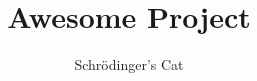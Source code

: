 \documentclass[sigconf,screen,review]{acmart}
\begin{document}
\title{Awesome Project}

\author{Schr\"{o}dinger's Cat}



\renewcommand\footnotetextcopyrightpermission[1]{}

\maketitle












\clearpage

\end{document}
